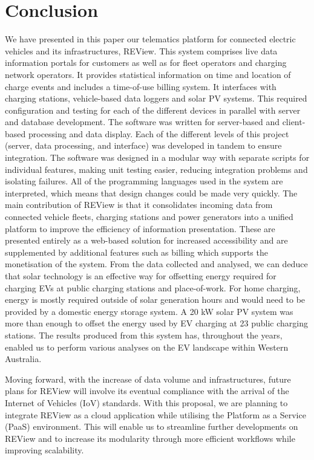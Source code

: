 \section{Conclusion}
\label{sec:9:conclusion}
We have presented in this paper our telematics platform for connected electric vehicles and its infrastructures, REView. This system comprises live data information portals for customers as well as for fleet operators and charging network operators. It provides statistical information on time and location of charge events and includes a time-of-use billing system. It interfaces with charging stations, vehicle-based data loggers and solar PV systems. This required configuration and testing for each of the different devices in parallel with server and database development. The software was written for server-based and client-based processing and data display. Each of the different levels of this project (server, data processing, and interface) was developed in tandem to ensure integration. The software was designed in a modular way with separate scripts for individual features, making unit testing easier, reducing integration problems and isolating failures. All of the programming languages used in the system are interpreted, which means that design changes could be made very quickly. The main contribution of REView is that it consolidates incoming data from connected vehicle fleets, charging stations and power generators into a unified platform to improve the efficiency of information presentation. These are presented entirely as a web-based solution for increased accessibility and are supplemented by additional features such as billing which supports the monetisation of the system. From the data collected and analysed, we can deduce that solar technology is an effective way for offsetting energy required for charging EVs at public charging stations and place-of-work. For home charging, energy is mostly required outside of solar generation hours and would need to be provided by a domestic energy storage system. A 20 kW solar PV system was more than enough to offset the energy used by EV charging at 23 public charging stations. The results produced from this system has, throughout the years, enabled us to perform various analyses on the EV landscape within Western Australia. 

Moving forward, with the increase of data volume and infrastructures, future plans for REView will involve its eventual compliance with the arrival of the Internet of Vehicles (IoV) standards. With this proposal, we are planning to integrate REView as a cloud application while utilising the Platform as a Service (PaaS) environment. This will enable us to streamline further developments on REView and to increase its modularity through more efficient workflows while improving scalability.

